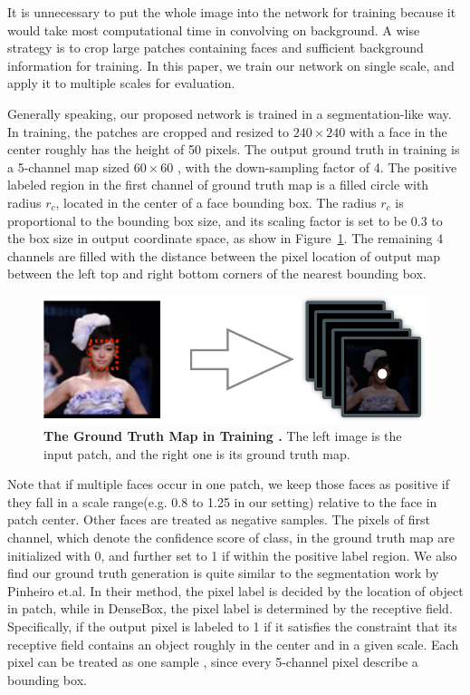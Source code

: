 It is unnecessary to put the whole image into the network for training because it would take most computational time in convolving on background. A wise strategy is to crop large patches containing faces and sufficient background information for training. In this paper, we train our network on single scale, and apply it to multiple scales for evaluation. 

Generally speaking, our proposed network is trained in a segmentation-like way.   In training, the patches are cropped and resized to $240 \times 240$ with a face in the center roughly has the height of 50 pixels. The output ground truth in training is a 5-channel map sized $60 \times 60 $ , with the down-sampling factor of 4. The positive labeled region in the first channel of ground truth map is a filled circle with radius $r_c$, located in the center of a face bounding box. The radius $r_c$ is proportional to the bounding box size, and its scaling factor is set to be 0.3 to the box size in output coordinate space, as show in Figure~\ref{fig:fig_gt}. The remaining 4 channels are filled with the distance between the pixel location of output map between the left top and right bottom corners of the nearest bounding box.  

\begin{figure}[!hbtp]
\centering
\includegraphics[scale=0.55]{figures/figure2-crop.pdf}
\caption{\textbf{The Ground Truth Map in Training .} The left image is the input patch, and the right one is its ground truth map. }
\label{fig:fig_gt}
\end{figure}

Note that if multiple faces occur in one patch, we keep those faces as positive if they fall in a scale range(e.g. 0.8 to 1.25 in our setting) relative to the face in patch center. Other faces are treated as negative samples. The pixels of first channel, which denote the confidence score of class, in the ground truth map are initialized with 0, and further set to 1 if within the positive label region.  We also find our ground truth generation is quite similar to the segmentation work\cite{pinheiro2015learning} by Pinheiro et.al.   In their method, the pixel label is decided by the location of object in patch, while in DenseBox, the pixel label is determined by the receptive field. Specifically, if the output pixel is labeled to 1 if it satisfies the constraint that its receptive field contains an object roughly in the center and in a given scale. Each pixel can be treated as one sample , since every 5-channel pixel describe a bounding box.


